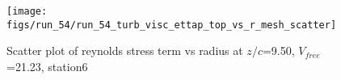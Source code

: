 \begin{figure}[H]
\centering
\texttt{[image: figs/run\_54/run\_54\_turb\_visc\_ettap\_top\_vs\_r\_mesh\_scatter]}
\caption{Scatter plot of reynolds stress term vs radius at $z/c$=9.50, $V_{free}$=21.23, station6}
\label{fig:run_54_turb_visc_ettap_top_vs_r_mesh_scatter}
\end{figure}


